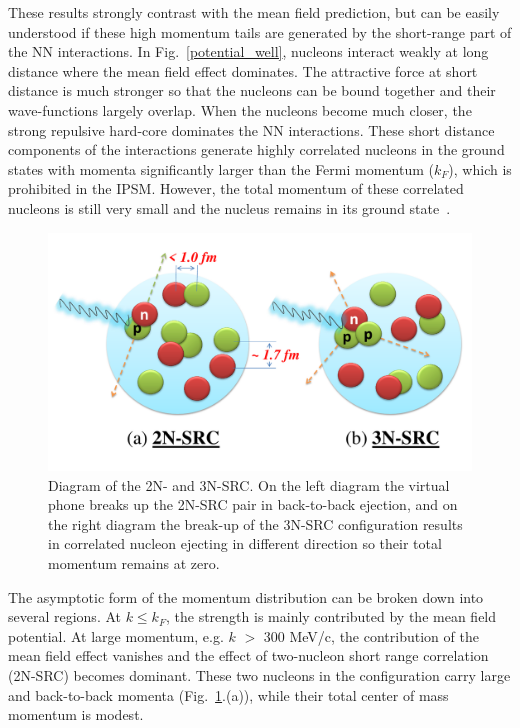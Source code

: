  These results strongly contrast with the mean field prediction, but can be easily understood if these high momentum tails are generated by the short-range part of the NN interactions. In Fig.~\ref{potential_well}, nucleons interact weakly at long distance where the mean field effect dominates. The attractive force at short distance is much stronger so that the nucleons can be bound together and their wave-functions largely overlap. When the nucleons become much closer, the strong repulsive hard-core dominates the NN interactions. These short distance components of the interactions generate highly correlated nucleons in the ground states with momenta significantly larger than the Fermi momentum ($k_{F}$), which is prohibited in the IPSM. However, the total momentum of these correlated nucleons is still very small and the nucleus remains in its ground state~\cite{src_john}.

\begin{figure}[!ht]
  \begin{center}
    \includegraphics[type=pdf,ext=.pdf,read=.pdf,width=0.80\linewidth]{./figures/physics/2NSRC3NSRC}
    \caption[Diagrams of the 2N- and 3N-SRC]{\footnotesize{Diagram of the 2N- and 3N-SRC. On the left diagram the virtual phone breaks up the 2N-SRC pair in back-to-back ejection, and on the right diagram the break-up of  the 3N-SRC configuration results in correlated nucleon ejecting in different direction so their total momentum remains at zero.}}
    \label{2nsrc3nsrc}
  \end{center}
\end{figure}
 The asymptotic form of the momentum distribution can be broken down into several regions. At $k\leq k_{F}$, the strength is mainly contributed by the mean field potential. At large momentum, e.g. $k$ $>$ 300 MeV/c, the contribution of the mean field effect vanishes and the effect of two-nucleon short range correlation (2N-SRC) becomes dominant. These two nucleons in the configuration carry large and back-to-back momenta (Fig.~\ref{2nsrc3nsrc}.(a)), while their total center of mass momentum is modest. 

